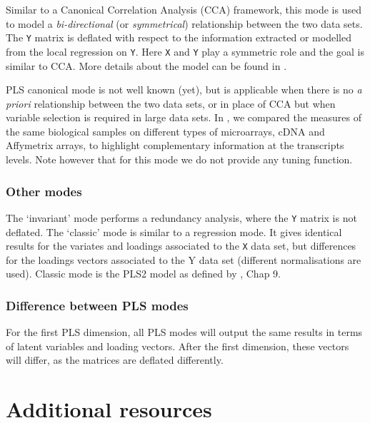 \documentclass[]{book}
\begin{document}
Similar to a Canonical Correlation Analysis (CCA) framework, this mode is used to model a \emph{bi-directional} (or \emph{symmetrical}) relationship between the two data sets. The \texttt{Y} matrix is deflated with respect to the information extracted or modelled from the local regression on \texttt{Y}. Here \texttt{X} and \texttt{Y} play a symmetric role and the goal is similar to CCA. More details about the model can be found in \citep{Lec09a}.

PLS canonical mode is not well known (yet), but is applicable when there is no \emph{a priori} relationship between the two data sets, or in place of CCA but when variable selection is required in large data sets. In \citep{Lec09a}, we compared the measures of the same biological samples on different types of microarrays, cDNA and Affymetrix arrays, to highlight complementary information at the transcripts levels. Note however that for this mode we do not provide any tuning function.

\hypertarget{other-modes}{%
\subsubsection{Other modes}\label{other-modes}}

The `invariant' mode performs a redundancy analysis, where the \texttt{Y} matrix is not deflated. The `classic' mode is similar to a regression mode. It gives identical results for the variates and loadings associated to the \texttt{X} data set, but differences for the loadings vectors associated to the Y data set (different normalisations are used). Classic mode is the PLS2 model as defined by \citep{Ten98}, Chap 9.

\hypertarget{difference-between-pls-modes}{%
\subsubsection{Difference between PLS modes}\label{difference-between-pls-modes}}

For the first PLS dimension, all PLS modes will output the same results in terms of latent variables and loading vectors. After the first dimension, these vectors will differ, as the matrices are deflated differently.

\hypertarget{additional-resources-2}{%
\section{Additional resources}\label{additional-resources-2}}
\end{document}
